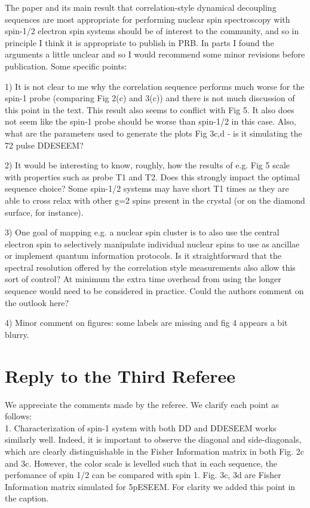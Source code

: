 \documentclass[12pt]{amsart}
\begin{document}
	The paper and its main result that correlation-style dynamical
	decoupling sequences are most appropriate for performing nuclear spin
	spectroscopy with spin-1/2 electron spin systems should be of interest
	to the community, and so in principle I think it is appropriate to
	publish in PRB. In parts I found the arguments a little unclear and so
	I would recommend some minor revisions before publication. Some
	specific points:
	
	1) It is not clear to me why the correlation sequence performs much
	worse for the spin-1 probe (comparing Fig 2(c) and 3(c)) and there is
	not much discussion of this point in the text. This result also seems
	to conflict with Fig 5. It also does not seem like the spin-1 probe
	should be worse than spin-1/2 in this case. Also, what are the
	parameters used to generate the plots Fig 3c,d - is it simulating the
	72 pulse DDESEEM?
	
	2) It would be interesting to know, roughly, how the results of e.g.
	Fig 5 scale with properties such as probe T1 and T2. Does this
	strongly impact the optimal sequence choice? Some spin-1/2 systems may
	have short T1 times as they are able to cross relax with other g=2
	spins present in the crystal (or on the diamond surface, for
	instance).
	
	3) One goal of mapping e.g. a nuclear spin cluster is to also use the
	central electron spin to selectively manipulate individual nuclear
	spins to use as ancillae or implement quantum information protocols.
	Is it straightforward that the spectral resolution offered by the
	correlation style measurements also allow this sort of control? At
	minimum the extra time overhead from using the longer sequence would
	need to be considered in practice. Could the authors comment on the
	outlook here?
	
	4) Minor comment on figures: some labels are missing and fig 4 appears
	a bit blurry.
	
	\color{black} \section*{ Reply to the Third Referee}
	We appreciate the comments made by the referee. We clarify each point as follows:\\
	
	1. Characterization of spin-1 system with both DD and DDESEEM works similarly well. Indeed, it is important to observe the diagonal and side-diagonals, which are clearly distinguishable in the Fisher Information matrix in both Fig. 2c and 3c. However, the color scale is levelled such that in each sequence, the perfomance of spin 1/2 can be compared with spin 1. Fig. 3c, 3d are Fisher Information matrix simulated for 5pESEEM. For clarity we added this point in the caption.\\
	
\end{document}
